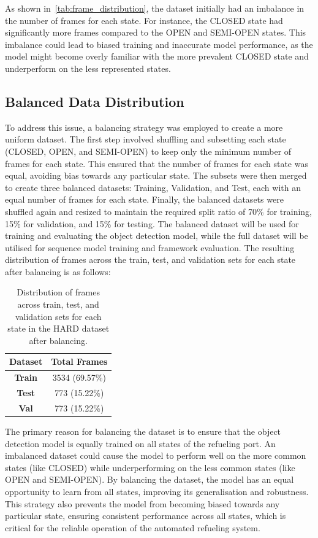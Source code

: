 \documentclass[12pt,oneside]{book} %
\begin{document}
As shown in~\ref{tab:frame_distribution}, the dataset initially had an
imbalance in the number of frames for each state. For instance, the CLOSED
state had significantly more frames compared to the OPEN and SEMI-OPEN states.
This imbalance could lead to biased training and inaccurate model performance,
as the model might become overly familiar with the more prevalent CLOSED state
and underperform on the less represented states.

\subsection{Balanced Data Distribution}
To address this issue, a balancing strategy was employed to create a more
uniform dataset. The first step involved shuffling and subsetting each state
(CLOSED, OPEN, and SEMI-OPEN) to keep only the minimum number of frames for
each state. This ensured that the number of frames for each state was equal,
avoiding bias towards any particular state. The subsets were then merged to
create three balanced datasets: Training, Validation, and Test, each with an
equal number of frames for each state. Finally, the balanced datasets were
shuffled again and resized to maintain the required split ratio of 70\% for
training, 15\% for validation, and 15\% for testing. The balanced dataset will
be used for training and evaluating the object detection model, while the full
dataset will be utilised for sequence model training and framework evaluation.
The resulting distribution of frames across the train, test, and validation
sets for each state after balancing is as follows:
\begin{table}[H]
    \centering
    \begin{tabular}{@{}cc@{}}
        \toprule
        \textbf{Dataset} & \textbf{Total Frames} \\ \midrule
        \textbf{Train}   & 3534 (69.57\%)        \\ 
        \textbf{Test}    & 773  (15.22\%)        \\ 
        \textbf{Val}     & 773  (15.22\%)        \\ \bottomrule
    \end{tabular}
    \caption{\centering Distribution of frames across train, test, and validation sets for each state in the HARD dataset after balancing.}
    \label{tab:balanced_frame_distribution}
\end{table}

The primary reason for balancing the dataset is to ensure that the object
detection model is equally trained on all states of the refueling port. An
imbalanced dataset could cause the model to perform well on the more common
states (like CLOSED) while underperforming on the less common states (like OPEN
and SEMI-OPEN). By balancing the dataset, the model has an equal opportunity to
learn from all states, improving its generalisation and robustness. This
strategy also prevents the model from becoming biased towards any particular
state, ensuring consistent performance across all states, which is critical for
the reliable operation of the automated refueling system.
\end{document}
